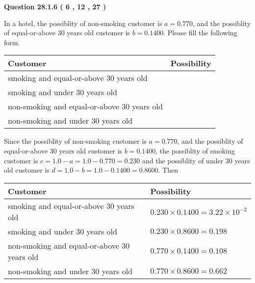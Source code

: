 \documentclass[12pt]{article}
\begin{document}
   
  
\vspace{0.2in}
  
{\textbf{\Large{Question
28.1.6 
 (           6 ,          12 ,          27 )
}}}
  
  
In a hotel, the possiblity of  %
non-smoking customer is
$a =  %
0.770$, and the possiblity of  %
equal-or-above 30 years old customer is $ b =  %
0.1400$.
Please fill the following form.
 
\noindent
\begin{tabular}{|l|l|}
\hline
Customer & Possibility \\
\hline
smoking  and   %
equal-or-above 30 years old  & \\
\hline
smoking  and   %
under 30 years old & \\
\hline
 non-smoking and   %
equal-or-above 30 years old  & \\
\hline
 non-smoking and  %
under 30 years old & \\
\hline
\end{tabular}
 
 
 
 
 
\noindent{}
 
 

Since the possiblity of  %
 non-smoking customer is $ a =  %
0.770 $,
and the possiblity of  %
equal-or-above 30 years old customer is $ b =  %
0.1400 $,
the possiblity of  %
smoking customer is $ c = 1.0 - a = 1.0 -
0.770
=  %
0.230 $ and the possiblity of  %
under 30 years old
customer is $ d = 1.0 - b = 1.0 -  %
0.1400 =  %
0.8600  $.
Then
 
\noindent
\begin{tabular}{|l|l|}
\hline
Customer & Possibility \\
\hline
smoking  and  %
equal-or-above 30 years old  &
  $ %
0.230 \times  %
0.1400 =  %
3.22 \times 10^{-2}$ \\
\hline
smoking  and  %
under 30 years old &
  $ %
0.230 \times  %
0.8600 =  %
0.198$ \\
\hline
 non-smoking and  %
equal-or-above 30 years old  &
  $ %
0.770 \times  %
0.1400 =  %
0.108$ \\
\hline
 non-smoking and  %
under 30 years old &
  $ %
0.770 \times  %
0.8600 =  %
0.662$ \\
\hline
\end{tabular}
 
\end{document}
